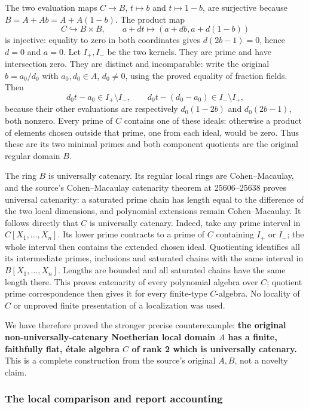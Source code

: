 The two evaluation maps \(C\to B\), \(t\mapsto b\) and \(t\mapsto1-b\), are surjective because \(B=A+Ab=A+A(1-b)\). The product map \[
 C\hookrightarrow B\times B,\qquad
 a+dt\longmapsto(a+db,a+d(1-b))
\] is injective: equality to zero in both coordinates gives \(d(2b-1)=0\), hence \(d=0\) and \(a=0\). Let \(I_+,I_-\) be the two kernels. They are prime and have intersection zero. They are distinct and incomparable: write the original \(b=a_0/d_0\) with \(a_0,d_0\in A\), \(d_0\ne0\), using the proved equality of fraction fields. Then \[
 d_0t-a_0\in I_+\setminus I_-,\qquad
 d_0t-(d_0-a_0)\in I_-\setminus I_+,
\] because their other evaluations are respectively \(d_0(1-2b)\) and \(d_0(2b-1)\), both nonzero. Every prime of \(C\) contains one of these ideals: otherwise a product of elements chosen outside that prime, one from each ideal, would be zero. Thus these are its two minimal primes and both component quotients are the original regular domain \(B\).

The ring \(B\) is universally catenary. Its regular local rings are Cohen--Macaulay, and the source's Cohen--Macaulay catenarity theorem at 25606--25638 proves universal catenarity: a saturated prime chain has length equal to the difference of the two local dimensions, and polynomial extensions remain Cohen--Macaulay. It follows directly that \(C\) is universally catenary. Indeed, take any prime interval in \(C[X_1,\ldots,X_n]\). Its lower prime contracts to a prime of \(C\) containing \(I_+\) or \(I_-\); the whole interval then contains the extended chosen ideal. Quotienting identifies all its intermediate primes, inclusions and saturated chains with the same interval in \(B[X_1,\ldots,X_n]\). Lengths are bounded and all saturated chains have the same length there. This proves catenarity of every polynomial algebra over \(C\); quotient prime correspondence then gives it for every finite-type \(C\)-algebra. No locality of \(C\) or unproved finite presentation of a localization was used.

We have therefore proved the stronger precise counterexample: \textbf{the original non-universally-catenary Noetherian local domain \(A\) has a finite, faithfully flat, étale algebra \(C\) of rank 2 which is universally catenary.} This is a complete construction from the source's original \(A,B\), not a novelty claim.

\subsubsection{The local comparison and report accounting}\label{algebra-proof-069-the-local-comparison-and-report-accounting}

